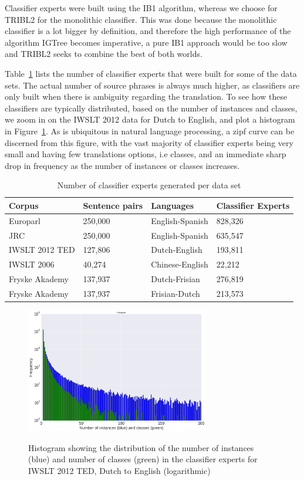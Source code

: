 \documentclass[smallextended]{svjour3}       %
\theoremstyle{break}
\begin{document}
Classifier experts were built using the IB1 algorithm, whereas we choose for
TRIBL2 for the monolithic classifier. This was done because the monolithic
classifier is a lot bigger by definition, and therefore the high performance of
the algorithm IGTree becomes imperative, a pure IB1 approach would be too slow
and TRIBL2 seeks to combine the best of both worlds.

Table~\ref{tab:expertcount} lists the number of classifier experts that were
built for some of the data sets. The actual number of source phrases is always
much higher, as classifiers are only built when there is ambiguity regarding
the translation. To see how these classifiers are typically distributed, based
on the number of instances and classes, we zoom in on the IWSLT 2012 data for
Dutch to English, and plot a histogram in Figure~\ref{fig:histogram}. As is
ubiquitous in natural language processing, a zipf curve can be discerned from
this figure, with the vast majority of classifier experts being very small and
having few translations options, i.e classes, and an immediate sharp drop in
frequency as the number of instances or classes increases.

\begin{table}
\begin{tabular}{|lll|l|}
\hline
\textbf{Corpus} & \textbf{Sentence pairs} & \textbf{Languages} & \textbf{Classifier Experts} \\
\hline
Europarl & 250,000 & English-Spanish & 828,326 \\
JRC & 250,000 & English-Spanish & 635,547 \\
IWSLT 2012 TED & 127,806 & Dutch-English & 193,811 \\
IWSLT 2006 & 40,274 & Chinese-English & 22,212 \\
Fryske Akademy & 137,937 & Dutch-Frisian & 276,819 \\
Fryske Akademy & 137,937 & Frisian-Dutch & 213,573 \\
\hline
\end{tabular}
\label{tab:expertcount}
\caption{Number of classifier experts generated per data set}
\end{table}


\begin{figure}
\includegraphics[width=80.00mm]{classifierhistogram.png}
\label{fig:histogram}
\caption{Histogram showing the distribution of the number of instances (blue) and number of classes (green) in the classifier experts for IWSLT 2012 TED, Dutch to English (logarithmic)}
\end{figure}
\end{document}
